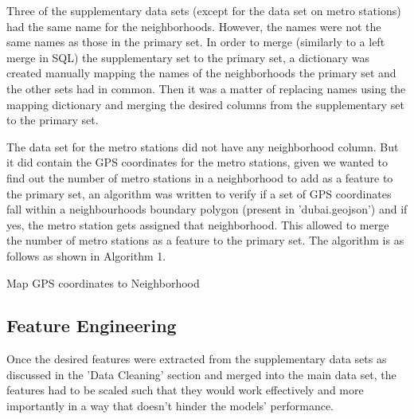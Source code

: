 \documentclass[conference]{IEEEtran}
\begin{document}
Three of the supplementary data sets (except for the data set on metro stations) had the same name for the neighborhoods. However, the names were not the same names as those in the primary set. In order to merge (similarly to a left merge in SQL) the supplementary set to the primary set, a dictionary was created manually mapping the names of the neighborhoods the primary set and the other sets had in common. Then it was a matter of replacing names using the mapping dictionary and merging the desired columns from the supplementary set to the primary set.

The data set for the metro stations did not have any neighborhood column. But it did contain the GPS coordinates for the metro stations, given we wanted to find out the number of metro stations in a neighborhood to add as a feature to the primary set, an algorithm was written to verify if a set of GPS coordinates fall within a neighbourhoods boundary polygon (present in 'dubai.geojson') and if yes, the metro station gets assigned that neighborhood. This allowed to merge the number of metro stations as a feature to the primary set. The algorithm is as follows as shown in Algorithm 1.


\begin{algorithm}
\caption{Map GPS coordinates to Neighborhood}
\begin{algorithmic} 
\ENDIF
\ENDFOR
\ENDFOR
\end{algorithmic}
\end{algorithm}



\subsection{Feature Engineering}

Once the desired features were extracted from the supplementary data sets as discussed in the 'Data Cleaning' section and merged into the main data set, the features had to be scaled such that they would work effectively and more importantly in a way that doesn't hinder the models' performance. 
\end{document}
